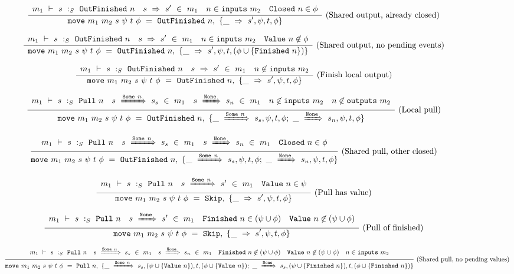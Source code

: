 \begin{figure*}
$$
\frac {\displaystyle 
    \begin{array}{lccr}  m_1 ~\vdash~ s ~:_S~ \mathtt{OutFinished}~n  &  s ~\Rightarrow~ s' ~\in~m_1  &  n \in \mathtt{inputs}~m_2  &  \mathtt{Closed}~n \in \phi  \end{array}
} {\displaystyle 
    \mathtt{move}~m_1~m_2~s~\psi~t~\phi~=~\mathtt{OutFinished}~n,~\{\_~\Rightarrow~s',\psi,t,\phi\}
} \ 
\textrm{(Shared output, already closed)}
$$

$$
\frac {\displaystyle 
    \begin{array}{lccr}  m_1 ~\vdash~ s ~:_S~ \mathtt{OutFinished}~n  &  s ~\Rightarrow~ s' ~\in~m_1  &  n \in \mathtt{inputs}~m_2  &  \mathtt{Value}~n \not\in \phi  \end{array}
} {\displaystyle 
    \mathtt{move}~m_1~m_2~s~\psi~t~\phi~=~\mathtt{OutFinished}~n,~\{\_~\Rightarrow~s',\psi,t,(\phi \cup \{ \mathtt{Finished}~n \})\}
} \ 
\textrm{(Shared output, no pending events)}
$$

$$
\frac {\displaystyle 
    \begin{array}{lcr}  m_1 ~\vdash~ s ~:_S~ \mathtt{OutFinished}~n  &  s ~\Rightarrow~ s' ~\in~m_1  &  n \not\in \mathtt{inputs}~m_2  \end{array}
} {\displaystyle 
    \mathtt{move}~m_1~m_2~s~\psi~t~\phi~=~\mathtt{OutFinished}~n,~\{\_~\Rightarrow~s',\psi,t,\phi\}
} \ 
\textrm{(Finish local output)}
$$

$$
\frac {\displaystyle 
    \begin{array}{lcccr}  m_1 ~\vdash~ s ~:_S~ \mathtt{Pull}~n  &  s ~\xRightarrow{\mathtt{Some}~n}~ s_s ~\in~m_1  &  s ~\xRightarrow{\mathtt{None}}~ s_n ~\in~m_1  &  n \not\in \mathtt{inputs}~m_2  &  n \not\in \mathtt{outputs}~m_2  \end{array}
} {\displaystyle 
    \mathtt{move}~m_1~m_2~s~\psi~t~\phi~=~\mathtt{OutFinished}~n,~\{ \_~\xRightarrow{\mathtt{Some}~n}~s_s, \psi, t, \phi
         ;~
          \_~\xRightarrow{\mathtt{None}}~s_n, \psi, t, \phi \}
} \ 
\textrm{(Local pull)}
$$

$$
\frac {\displaystyle 
    \begin{array}{lccr}  m_1 ~\vdash~ s ~:_S~ \mathtt{Pull}~n  &  s ~\xRightarrow{\mathtt{Some}~n}~ s_s ~\in~m_1  &  s ~\xRightarrow{\mathtt{None}}~ s_n ~\in~m_1  &  \mathtt{Closed}~n \in \phi  \end{array}
} {\displaystyle 
    \mathtt{move}~m_1~m_2~s~\psi~t~\phi~=~\mathtt{OutFinished}~n,~\{ \_~\xRightarrow{\mathtt{Some}~n}~s_s, \psi, t, \phi
         ;~
          \_~\xRightarrow{\mathtt{None}}~s_n, \psi, t, \phi \}
} \ 
\textrm{(Shared pull, other closed)}
$$


$$
\frac {\displaystyle 
    \begin{array}{lcr}  m_1 ~\vdash~ s ~:_S~ \mathtt{Pull}~n  &  s ~\xRightarrow{\mathtt{Some}~n}~ s' ~\in~m_1  &  \mathtt{Value}~n \in \psi  \end{array}
} {\displaystyle 
    \mathtt{move}~m_1~m_2~s~\psi~t~\phi~=~\mathtt{Skip},~\{ \_~\Rightarrow~s',\psi,t,\phi \}
} \ 
\textrm{(Pull has value)}
$$

$$
\frac {\displaystyle 
    \begin{array}{lccr}  m_1 ~\vdash~ s ~:_S~ \mathtt{Pull}~n  &  s ~\xRightarrow{\mathtt{None}}~ s' ~\in~m_1  &  \mathtt{Finished}~n \in (\psi \cup \phi)  &  \mathtt{Value}~n \not\in (\psi \cup \phi)  \end{array}
} {\displaystyle 
    \mathtt{move}~m_1~m_2~s~\psi~t~\phi~=~\mathtt{Skip},~\{ \_~\Rightarrow~s',\psi,t,\phi \}
} \ 
\textrm{(Pull of finished)}
$$

$$
\frac {\displaystyle 
        m_1 ~\vdash~ s ~:_S~ \mathtt{Pull}~n
        \quad
        s ~\xRightarrow{\mathtt{Some}~n}~ s_s ~\in~m_1
        \quad
        s ~\xRightarrow{\mathtt{None}}~ s_n ~\in~m_1
        \quad
        \mathtt{Finished}~n \not\in (\psi \cup \phi)
        \quad
        \mathtt{Value}~n \not\in (\psi \cup \phi)
        \quad
        n \in \mathtt{inputs}~m_2
} {\displaystyle 
    \mathtt{move}~m_1~m_2~s~\psi~t~\phi~=~\mathtt{Pull}~n,~\{ \_~\xRightarrow{\mathtt{Some}~n}~s_s, (\psi \cup \{ \mathtt{Value}~n \}), t, (\phi \cup \{ \mathtt{Value}~n \}) 
         ;~
          \_~\xRightarrow{\mathtt{None}}~s_s, (\psi \cup \{ \mathtt{Finished}~n \}), t, (\phi \cup \{ \mathtt{Finished}~n \}) 
         \}
} \ 
\textrm{(Shared pull, no pending values)}
$$


\end{figure*}
